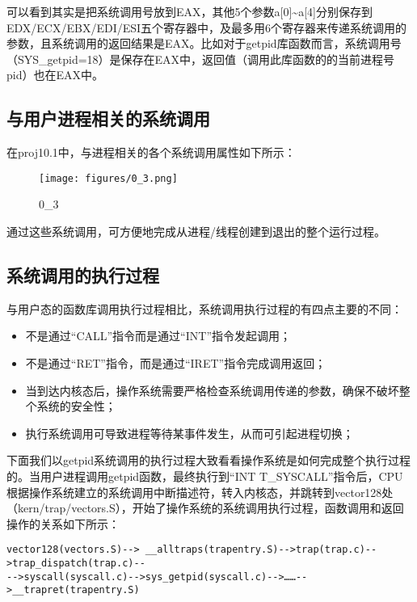 可以看到其实是把系统调用号放到EAX，其他5个参数a{[}0{]}\textasciitilde{}a{[}4{]}分别保存到EDX/ECX/EBX/EDI/ESI五个寄存器中，及最多用6个寄存器来传递系统调用的参数，且系统调用的返回结果是EAX。比如对于getpid库函数而言，系统调用号（SYS\_getpid=18）是保存在EAX中，返回值（调用此库函数的的当前进程号pid）也在EAX中。

\subsection{与用户进程相关的系统调用}\label{ux4e0eux7528ux6237ux8fdbux7a0bux76f8ux5173ux7684ux7cfbux7edfux8c03ux7528}

在proj10.1中，与进程相关的各个系统调用属性如下所示：

\begin{figure}[htbp]
\centering
\texttt{[image: figures/0\_3.png]}
\caption{0\_3}
\end{figure}

通过这些系统调用，可方便地完成从进程/线程创建到退出的整个运行过程。

\subsection{系统调用的执行过程}\label{ux7cfbux7edfux8c03ux7528ux7684ux6267ux884cux8fc7ux7a0b}

与用户态的函数库调用执行过程相比，系统调用执行过程的有四点主要的不同：

\begin{itemize}
\tightlist
\item
  不是通过``CALL''指令而是通过``INT''指令发起调用；
\item
  不是通过``RET''指令，而是通过``IRET''指令完成调用返回；
\item
  当到达内核态后，操作系统需要严格检查系统调用传递的参数，确保不破坏整个系统的安全性；
\item
  执行系统调用可导致进程等待某事件发生，从而可引起进程切换；
\end{itemize}

下面我们以getpid系统调用的执行过程大致看看操作系统是如何完成整个执行过程的。当用户进程调用getpid函数，最终执行到``INT
T\_SYSCALL''指令后，CPU根据操作系统建立的系统调用中断描述符，转入内核态，并跳转到vector128处（kern/trap/vectors.S），开始了操作系统的系统调用执行过程，函数调用和返回操作的关系如下所示：

\begin{lstlisting}
vector128(vectors.S)--> __alltraps(trapentry.S)-->trap(trap.c)-->trap_dispatch(trap.c)--
-->syscall(syscall.c)-->sys_getpid(syscall.c)-->……-->__trapret(trapentry.S)
\end{lstlisting}

